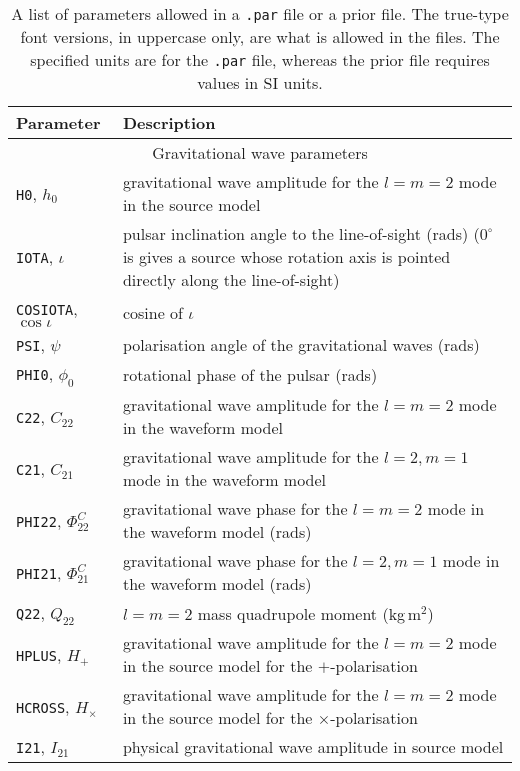 \begin{longtable}{p{}|p{}}
\caption{A list of parameters allowed in a {\tt .par} file or a prior file. The true-type font versions, in uppercase only,
are what is allowed in the files. The specified units are for the {\tt .par} file, whereas the prior file
requires values in SI units.}\label{tab:paramlist} \\
Parameter & Description \\
\hline
\multicolumn{2}{c}{Gravitational wave parameters} \\
\hline
{\tt H0}, $h_0$      & gravitational wave amplitude for the $l=m=2$ mode in the source model \citep[see, e.g.,][]{1998PhRvD..58f3001J} \\
{\tt IOTA}, $\iota$  & pulsar inclination angle to the line-of-sight (rads) ($0^{\circ}$ is gives a source whose rotation axis is pointed directly along the line-of-sight) \\
{\tt COSIOTA}, $\cos{\iota}$ & cosine of $\iota$ \\
{\tt PSI}, $\psi$    & polarisation angle of the gravitational waves (rads) \citep[see, e.g.,][]{1998PhRvD..58f3001J} \\
{\tt PHI0}, $\phi_0$ & rotational phase of the pulsar (rads) \\
{\tt C22}, $C_{22}$  & gravitational wave amplitude for the $l=m=2$ mode in the waveform model \citep[see][]{2015MNRAS.453.4399P} \\
{\tt C21}, $C_{21}$  & gravitational wave amplitude for the $l=2, m=1$ mode in the waveform model \citep[see][]{2015MNRAS.453.4399P} \\
{\tt PHI22}, $\Phi_{22}^C$ & gravitational wave phase for the $l=m=2$ mode in the waveform model (rads) \citep[see][]{2015MNRAS.453.4399P} \\
{\tt PHI21}, $\Phi_{21}^C$ & gravitational wave phase for the $l=2, m=1$ mode in the waveform model (rads) \citep[see][]{2015MNRAS.453.4399P} \\
{\tt Q22}, $Q_{22}$ & $l=m=2$ mass quadrupole moment (kg\,m$^{2}$) \citep[see e.g.][]{2005PhRvL..95u1101O} \\
{\tt HPLUS}, $H_+$ &  gravitational wave amplitude for the $l=m=2$ mode in the source model for the $+$-polarisation \\
{\tt HCROSS}, $H_{\times}$ &  gravitational wave amplitude for the $l=m=2$ mode in the source model for the $\times$-polarisation \\
{\tt I21}, $I_{21}$ & physical gravitational wave amplitude in source model \citep[see][]{2015MNRAS.453.4399P} \\

\end{longtable}
